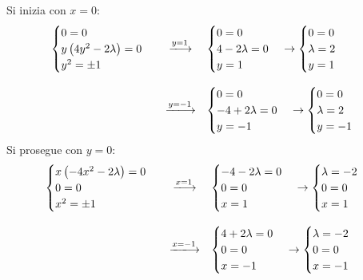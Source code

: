 \documentclass[a4paper]{article}
\begin{document}
	\noindent
	Si inizia con $x = 0$:
	\begin{equation*}
		\begin{array}{lcl}
			\begin{cases}
				0 = 0 \\
				y\left(4y^{2} - 2 \lambda\right) = 0 \\
				y^{2} = \pm 1
			\end{cases}
			&\xlongrightarrow{y = 1}&
			\begin{cases}
				0 = 0 \\
				4 - 2 \lambda = 0 \\
				y = 1
			\end{cases}
			\rightarrow
			\begin{cases}
				0 = 0 \\
				\lambda = 2 \\
				y = 1
			\end{cases} \\
			\\
			&\xlongrightarrow{y = -1}&
			\begin{cases}
				0 = 0 \\
				-4 +2 \lambda = 0 \\
				y = -1
			\end{cases}
			\rightarrow
			\begin{cases}
				0 = 0 \\
				\lambda = 2 \\
				y = -1
			\end{cases}
		\end{array}
	\end{equation*}
	Si prosegue con $y = 0$:
	\begin{equation*}
		\begin{array}{lcl}
			\begin{cases}
				x\left(-4x^{2} - 2\lambda\right) = 0 \\
				0 = 0 \\
				x^{2} = \pm 1
			\end{cases}
			&\xlongrightarrow{x = 1}&
			\begin{cases}
				-4 - 2\lambda = 0 \\
				0 = 0 \\
				x = 1
			\end{cases}
			\rightarrow
			\begin{cases}
				\lambda = - 2 \\
				0 = 0 \\
				x = 1
			\end{cases} \\
			\\
			&\xlongrightarrow{x = -1}&
			\begin{cases}
				4 + 2\lambda = 0 \\
				0 = 0 \\
				x = - 1
			\end{cases}
			\rightarrow
			\begin{cases}
				\lambda = -2 \\
				0 = 0 \\
				x = - 1
			\end{cases}
		\end{array}
	\end{equation*}
\end{document}
